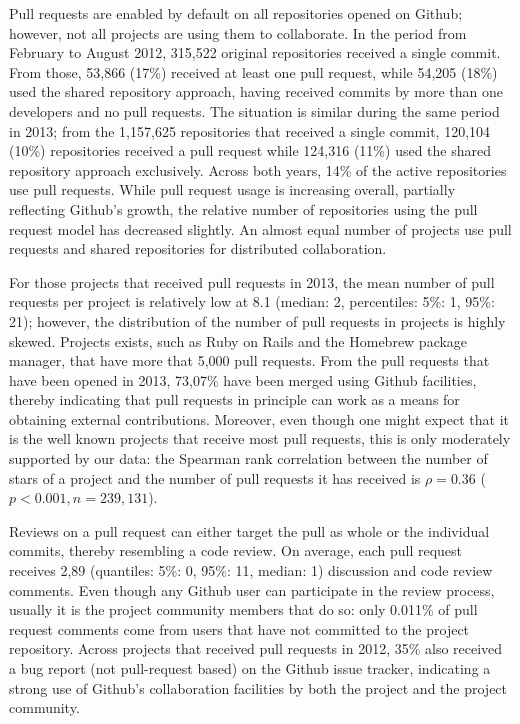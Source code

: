 \documentclass{sig-alternate}
\begin{document}
Pull requests are enabled by default on all repositories opened on Github;
however, not all projects are using them to collaborate.  In the period from
February to August 2012, 315,522 original repositories received a single commit.
From those, 53,866 (17\%) received at least one pull request, while 54,205
(18\%) used the shared repository approach, having received commits by more than
one developers and no pull requests.  The situation is similar during the same
period in 2013; from the 1,157,625 repositories that received a single commit,
120,104 (10\%) repositories received a pull request while 124,316 (11\%) used
the shared repository approach exclusively. Across both years, 14\% of the
active repositories use pull requests.  While pull request usage is increasing
overall, partially reflecting Github's growth, the relative number of
repositories using the pull request model has decreased slightly.  An almost
equal number of projects use pull requests and shared repositories for
distributed collaboration.

For those projects that received pull requests in 2013, the mean number of pull
requests per project is relatively low at 8.1 (median: 2, percentiles: 5\%: 1,
95\%: 21); however, the distribution of the number of pull requests in projects
is highly skewed. Projects exists, such as Ruby on Rails and the Homebrew
package manager, that have more that 5,000 pull requests. From the pull requests
that have been opened in 2013, 73,07\% have been merged using Github facilities,
thereby indicating that pull requests in principle can work as a means for
obtaining external contributions. Moreover, even though one might expect that it
is the well known projects that receive most pull requests, this is only
moderately supported by our data: the Spearman rank correlation between the
number of stars of a project and the number of pull requests it has received is
$\rho = 0.36$ ($p < 0.001, n = 239,131$).

Reviews on a pull request can either target the pull as whole or the individual
commits, thereby resembling a code review. On average, each pull request
receives 2,89 (quantiles: 5\%: 0, 95\%: 11, median: 1) discussion and code
review comments.  Even though any Github user can participate in the review
process, usually it is the project community members that do so: only 0.011\% of
pull request comments come from users that have not committed to the project
repository. Across projects that received pull requests in 2012, 35\% also
received a bug report (not pull-request based) on the Github issue tracker,
indicating a strong use of Github's collaboration facilities by both the project
and the project community.
\end{document}
